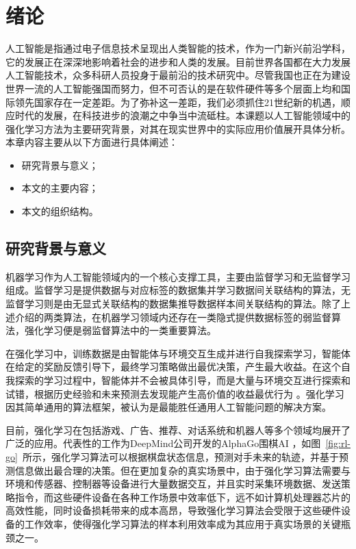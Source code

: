 
\chapter{绪论}\label{chap:intro}

人工智能是指通过电子信息技术呈现出人类智能的技术，作为一门新兴前沿学科，它的发展正在深深地影响着社会的进步和人类的发展。目前世界各国都在大力发展人工智能技术，众多科研人员投身于最前沿的技术研究中。尽管我国也正在为建设世界一流的人工智能强国而努力，但不可否认的是在软件硬件等多个层面上均和国际领先国家存在一定差距。为了弥补这一差距，我们必须抓住21世纪新的机遇，顺应时代的发展，在科技进步的浪潮之中争当中流砥柱。本课题以人工智能领域中的强化学习方法为主要研究背景，对其在现实世界中的实际应用价值展开具体分析。本章内容主要从以下方面进行具体阐述：

\begin{itemize}
    \item 研究背景与意义；
    \item 本文的主要内容；
    \item 本文的组织结构。
\end{itemize}

\section{研究背景与意义}

机器学习作为人工智能领域内的一个核心支撑工具，主要由监督学习和无监督学习组成\cite{sathya2013comparison,goodfellow2016deep}。监督学习是提供数据与对应标签的数据集并学习数据间关联结构的算法，无监督学习则是由无显式关联结构的数据集推导数据样本间关联结构的算法\cite{bishop2006pattern}。除了上述介绍的两类算法，在机器学习领域内还存在一类隐式提供数据标签的弱监督算法\cite{zhou2018brief}，强化学习便是弱监督算法中的一类重要算法。

在强化学习中，训练数据是由智能体与环境交互生成并进行自我探索学习，智能体在给定的奖励反馈引导下，最终学习策略做出最优决策，产生最大收益\cite{tan1993multi}。在这个自我探索的学习过程中，智能体并不会被具体引导，而是大量与环境交互进行探索和试错，根据历史经验和未来预测去发现能产生高价值的收益最优行为 \cite{kaelbling1996reinforcement,sutton2018reinforcement}。强化学习因其简单通用的算法框架，被认为是最能胜任通用人工智能问题的解决方案\cite{shoham2003multi}。 

目前，强化学习在包括游戏、广告、推荐、对话系统和机器人等多个领域均展开了广泛的应用\cite{cai2017real,wang2018reinforcement,li2016deep,riedmiller2009reinforcement}。代表性的工作为DeepMind公司开发的AlphaGo围棋AI \cite{chen2016evolution}，如图~\ref{fig:rl-go}~所示，强化学习算法可以根据棋盘状态信息，预测对手未来的轨迹，并基于预测信息做出最合理的决策\cite{holcomb2018overview}。但在更加复杂的真实场景中，由于强化学习算法需要与环境和传感器、控制器等设备进行大量数据交互，并且实时采集环境数据、发送策略指令，而这些硬件设备在各种工作场景中效率低下，远不如计算机处理器芯片的高效性能，同时设备损耗带来的成本高昂，导致强化学习算法会受限于这些硬件设备的工作效率\cite{zhang2021robust,yao2021sample}，使得强化学习算法的样本利用效率成为其应用于真实场景的关键瓶颈之一\cite{arulkumaran2017deep,kober2013reinforcement}。

